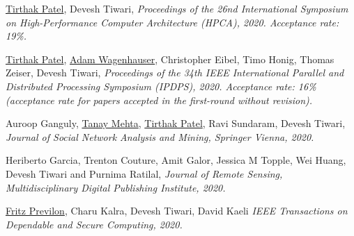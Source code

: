 {\textnormal{\newline \underline{Tirthak Patel}, Devesh Tiwari,}} {\textit{Proceedings of the 26nd International Symposium on High-Performance Computer Architecture (HPCA), 2020. Acceptance rate: 19\%.\newline}}{}{}{} %

{\textnormal{\newline \underline{Tirthak Patel}, \underline{Adam Wagenhauser}, Christopher Eibel, Timo Honig, Thomas Zeiser, Devesh Tiwari,}} {\textit{Proceedings of the 34th IEEE International Parallel and Distributed Processing
Symposium (IPDPS), 2020. Acceptance rate: 16\% (acceptance rate for papers accepted in the first-round without revision). \newline \newline}}{}{}{} %

{\textnormal{\newline Auroop Ganguly, \underline{Tanay Mehta}, \underline{Tirthak Patel}, Ravi Sundaram, Devesh Tiwari,}} {\textit{Journal of Social Network Analysis and Mining, Springer Vienna, 2020. \newline \newline}}{}{}{} %

{\textnormal{\newline Heriberto Garcia, Trenton Couture, Amit Galor, Jessica M Topple, Wei Huang, Devesh Tiwari and Purnima Ratilal,}} {\textit{Journal of Remote Sensing, Multidisciplinary Digital Publishing Institute, 2020. \newline \newline }}{}{}{} %

{\textnormal{\underline{Fritz Previlon}, Charu Kalra, Devesh Tiwari, David Kaeli}} {\textit{IEEE Transactions on Dependable and Secure Computing, 2020. \newline \newline}}{}{}{} %

